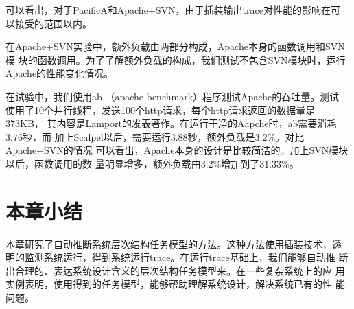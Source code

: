 可以看出，对于PacificA和Apache+SVN，由于插装输出trace对性能的影响在可
以接受的范围以内。

在Apache+SVN实验中，额外负载由两部分构成，Apache本身的函数调用和SVN模
块的函数调用。为了了解额外负载的构成，我们测试不包含SVN模块时，运行
Apache的性能变化情况。

在试验中，我们使用ab （apache benchmark）程序测试Apache的吞吐量。测试
使用了10个并行线程，发送100个http请求，每个http请求返回的数据量是373KB，
其内容是Lamport的发表著作。在运行干净的Aapche时，ab需要消耗3.76秒，而
加上Scalpel以后，需要运行3.88秒，额外负载是3.2\%。对比Apache+SVN的情况
可以看出，Apache本身的设计是比较简洁的。加上SVN模块以后，函数调用的数
量明显增多，额外负载由3.2\%增加到了31.33\%。

\section{本章小结}
\label{sec:scp:conclusion}

本章研究了自动推断系统层次结构任务模型的方法。这种方法使用插装技术，透
明的监测系统运行，得到系统运行trace。在运行trace基础上，我们能够自动推
断出合理的、表达系统设计含义的层次结构任务模型来。在一些复杂系统上的应
用实例表明，使用得到的任务模型，能够帮助理解系统设计，解决系统已有的性
能问题。

